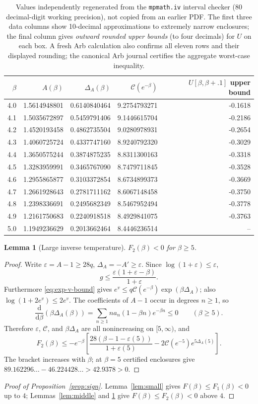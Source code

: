 \documentclass[10pt,a4paper]{article}
\numberwithin{equation}{section}
\newtheorem{lemma}[theorem]{Lemma}\newtheorem{proposition}[theorem]{Proposition}
\theoremstyle{remark}\newtheorem{remark}[theorem]{Remark}\newtheorem{question}[theorem]{Question}
\newcommand{\dd}{\mathrm d}
\begin{document}
\begin{table}[htbp]\centering\small
\begin{tabular}{rrrrr}\toprule
$\beta$&$A(\beta)$&$\Delta_A(\beta)$&$\mathcal C(e^{-\beta})$&$U[\beta,\beta+.1]$ upper bound\\\midrule
4.0&1.5614948801&0.6140840464&9.2754793271&-0.1618\\
4.1&1.5035672897&0.5459791406&9.1446615704&-0.2186\\
4.2&1.4520193458&0.4862735504&9.0280978931&-0.2654\\
4.3&1.4060725724&0.4337747160&8.9240792320&-0.3029\\
4.4&1.3650575244&0.3874875235&8.8311300163&-0.3318\\
4.5&1.3283959991&0.3465767090&8.7479711845&-0.3528\\
4.6&1.2955865877&0.3103372854&8.6734899373&-0.3669\\
4.7&1.2661928643&0.2781711162&8.6067148458&-0.3750\\
4.8&1.2398336691&0.2495682349&8.5467952494&-0.3778\\
4.9&1.2161750683&0.2240918518&8.4929841075&-0.3763\\
5.0&1.1949236629&0.2013662464&8.4446236514&--\\
\bottomrule
\end{tabular}
\caption{Values independently regenerated from the \texttt{mpmath.iv} interval checker (80 decimal-digit working precision), not copied from an earlier PDF. The first three data columns show 10-decimal approximations to extremely narrow enclosures; the final column gives \emph{outward rounded upper bounds} (to four decimals) for $U$ on each box. A fresh Arb calculation also confirms all eleven rows and their displayed rounding; the canonical Arb journal certifies the aggregate worst-case inequality.}\label{tab:intervals}
\end{table}
\begin{lemma}[Large inverse temperature]\label{lem:large}
$F_2(\beta)<0$ for $\beta\ge5$.
\end{lemma}
\begin{proof}Write $\varepsilon=A-1\ge28q$, $\Delta_A=-A'\ge\varepsilon$. Since $\log(1+\varepsilon)\le\varepsilon$,
\[
g\le\frac{\varepsilon(1+\varepsilon-\beta)}{1+\varepsilon}.
\]
Furthermore \eqref{eq:exp-v-bound} gives $e^v\le q\mathcal C(e^{-\beta})\exp(\beta\Delta_A)$; also $\log(1+2e^v)\le2e^v$. The coefficients of $A-1$ occur in degrees $n\ge1$, so
\[
\frac{\dd}{\dd\beta}(\beta\Delta_A(\beta))
=\sum_{n\ge1}na_n(1-\beta n)e^{-\beta n}\le0\qquad(\beta\ge5).
\]
Therefore $\varepsilon$, $\mathcal C$, and $\beta\Delta_A$ are all nonincreasing on $[5,\infty)$, and
\[
F_2(\beta)\le-e^{-\beta}\left[\frac{28(\beta-1-\varepsilon(5))}{1+\varepsilon(5)}-2\mathcal C(e^{-5})e^{5\Delta_A(5)}\right].
\]
The bracket increases with $\beta$; at $\beta=5$ certified enclosures give $89.162296\ldots-46.224428\ldots>42.9378>0$.\end{proof}
\begin{proof}[Proof of Proposition~\ref{prop:sign}]
Lemma~\ref{lem:small} gives $F(\beta)\le F_1(\beta)<0$ up to $4$; Lemmas~\ref{lem:middle} and \ref{lem:large} give $F(\beta)\le F_2(\beta)<0$ above $4$.\end{proof}
\end{document}
